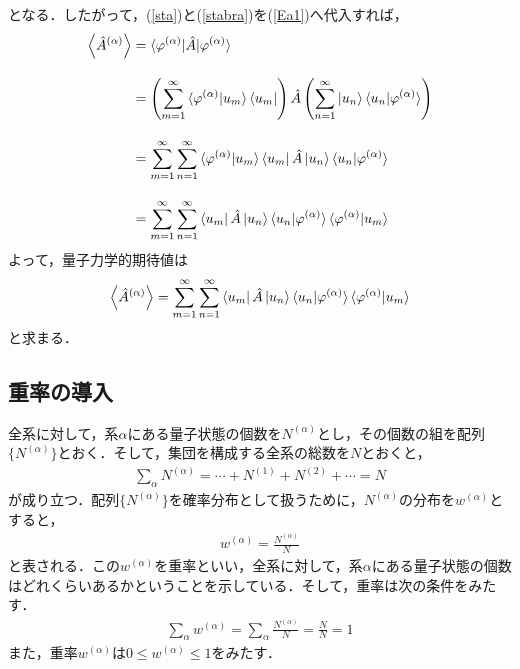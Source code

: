 \documentclass[12pt]{jsarticle}\usepackage{ifthen}\newboolean{enlarge}\setboolean{enlarge}{false}
\begin{document}
となる．したがって，(\ref{sta})と(\ref{stabra})を(\ref{Ea1})へ代入すれば，
%
　\begin{eqnarray*}
\begin{split}
\Braket{\hat{A}^{(\alpha)}}
&=\braket{\varphi^{(\alpha)}|\hat{A}|\varphi^{(\alpha)}}\\[10pt]
%
&=\left(
\displaystyle\sum_{m=1}^\infty
\braket{\varphi^{(\alpha)}|u_m}
\bra{u_m}
\right)
\hat{A}
\left(
\displaystyle\sum_{n=1}^\infty\ket{u_n}\braket{u_n|\varphi^{(\alpha)}}
\right)\\[10pt]
%
&=
\displaystyle\sum_{m=1}^\infty\displaystyle\sum_{n=1}^\infty
\braket{\varphi^{(\alpha)}|u_m}
\bra{u_m}
\hat{A}
\ket{u_n}\braket{u_n|\varphi^{(\alpha)}}
\\[10pt]
%
&=\displaystyle\sum_{m=1}^\infty\displaystyle\sum_{n=1}^\infty
\bra{u_m}
\hat{A}
\ket{u_n}\braket{u_n|\varphi^{(\alpha)}}\braket{\varphi^{(\alpha)}|u_m}
  \end{split}
\end{eqnarray*}
%
よって，量子力学的期待値は
　\begin{align}
\label{Ea2}
\Braket{\hat{A}^{(\alpha)}}=\displaystyle\sum_{m=1}^\infty\displaystyle\sum_{n=1}^\infty
\bra{u_m}
\hat{A}
\ket{u_n}\braket{u_n|\varphi^{(\alpha)}}\braket{\varphi^{(\alpha)}|u_m}
\end{align}
と求まる．




%
\subsection{重率の導入}
全系に対して，系$\alpha$にある量子状態の個数を$N^{(\alpha)}$とし，その個数の組を配列$\{N^{(\alpha)}\}$とおく．そして，集団を構成する全系の総数を$N$とおくと，
　\begin{align}
\label{N}
\displaystyle\sum_{\alpha}N^{(\alpha)}=\cdots+N^{(1)}+N^{(2)}+\cdots=N
\end{align}
が成り立つ．配列$\{N^{(\alpha)}\}$を確率分布として扱うために，$N^{(\alpha)}$の分布を$w^{(\alpha)}$とすると，
　\begin{align}
\label{w}
w^{(\alpha)}=
\frac{N^{(\alpha)}}
{N}
\end{align}
と表される．この$w^{(\alpha)}$を重率といい，全系に対して，系$\alpha$にある量子状態の個数はどれくらいあるかということを示している．そして，重率は次の条件をみたす．
　\begin{align}
\label{w1}
\displaystyle\sum_{\alpha}w^{(\alpha)}=
\displaystyle\sum_{\alpha}
\frac
{
N^{(\alpha)}
}
{N}
=\frac{N}{N}
=1
\end{align}
また，重率$w^{(\alpha)}$は$0\leq w^{(\alpha)}\leq1$をみたす．
\end{document}
